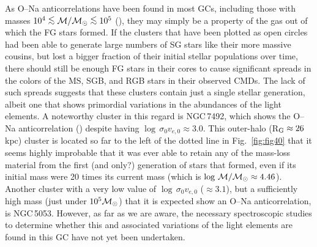 \documentclass[12pt,preprint]{aastex}
\newcommand\msol{{\cal M_{\odot}}}
\newcommand\lta{\mathrel{\hbox{\raise 0.6 ex \hbox{$<$}\kern
                   -1.8 ex\lower .5 ex\hbox{$\sim$}}}}
\begin{document}
As O--Na anticorrelations have been found in most GCs, including those with
masses $10^4 \lta {\cal M}/\msol \lta 10^5$ (\citealt{cbg10b}), they may simply
be a property of the gas out of which the FG stars formed.  If the clusters
that have been plotted as open circles had been able to generate large numbers
of SG stars like their more massive cousins, but lost a bigger fraction of their
initial stellar populations over time, there should still be enough FG stars in
their cores to cause significant spreads in the colors of the MS, SGB, and RGB
stars in their observed CMDs.  The lack of such spreads suggests that these
clusters contain just a single stellar generation, albeit one that shows
primordial variations in the abundances of the light elements.  A noteworthy
cluster in this regard is NGC$\,$7492, which shows the O--Na anticorrelation
(\citealt{cm05b}) despite having $\log\,\sigma_0v_{e,0} \approx 3.0$.  This
outer-halo (R$_{\rm G} \approx 26$ kpc) cluster is located so far to the left
of the dotted line in Fig.~\ref{fig:fig40} that it seems highly improbable that
it was ever able to retain any of the mass-loss material from the first (and
only?) generation of stars that formed, even if its initial mass were 20 times
its current mass (which is $\log\,{\cal M}/\msol \approx 4.46$).   Another
cluster with a very low value of $\log\,\sigma_0v_{e,0}$ ($\approx 3.1$), but a
sufficiently high mass (just under $10^5 \msol$) that it is expected show an
O--Na anticorrelation, is NGC$\,$5053.  However, as far as we are aware, the
necessary spectroscopic studies to determine whether this and associated
variations of the light elements are found in this GC have not yet been
undertaken.
\end{document}
